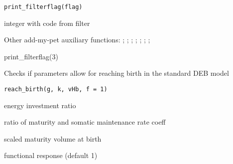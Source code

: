 \documentclass[a4paper]{book}
\begin{document}
%
\begin{Usage}
\begin{verbatim}
print_filterflag(flag)
\end{verbatim}
\end{Usage}
%
\begin{Arguments}
\begin{ldescription}
\item[\code{flag}] integer with code from filter
\end{ldescription}
\end{Arguments}
%
\begin{SeeAlso}\relax
Other add-my-pet auxiliary functions: ;
; ;
; ;
; ;
\end{SeeAlso}
%
\begin{Examples}
\begin{ExampleCode}
print_filterflag(3)
\end{ExampleCode}
\end{Examples}
%
\begin{Description}\relax
Checks if parameters allow for reaching birth in the standard DEB model
\end{Description}
%
\begin{Usage}
\begin{verbatim}
reach_birth(g, k, vHb, f = 1)
\end{verbatim}
\end{Usage}
%
\begin{Arguments}
\begin{ldescription}
\item[\code{g}] energy investment ratio

\item[\code{k}] ratio of maturity and somatic maintenance rate coeff

\item[\code{vHb}] scaled maturity volume at birth

\item[\code{f}] functional response (default 1)
\end{ldescription}
\end{Arguments}
\end{document}
